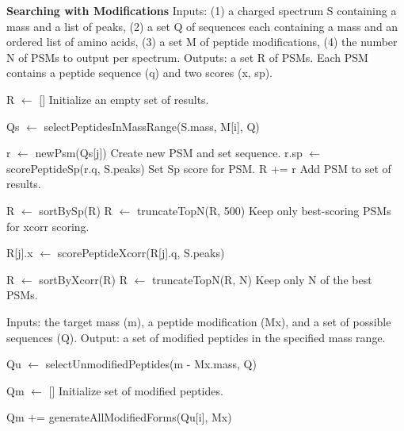 \documentclass[12pt]{article}
\begin{document}
\begin{algorithm}
\caption{{\bf Searching with Modifications} Inputs: (1) a charged
  spectrum S containing a mass and a list of peaks, (2) a set Q of
  sequences each containing a mass and an ordered list of amino acids,
  (3) a set M of peptide modifications, (4) the number N of PSMs to
  output per spectrum. Outputs: a set R of PSMs.  Each PSM contains a
  peptide sequence (q) and two scores (x, sp).}

\begin{algorithmic}[1]

\State R $\gets$ []
\Comment Initialize an empty set of results.

   \State Qs $\gets$ selectPeptidesInMassRange(S.mass, M[i], Q)
   
     \State r $\gets$ newPsm(Qs[j])
     \Comment Create new PSM and set sequence.
     \State r.sp $\gets$ scorePeptideSp(r.q, S.peaks)
     \Comment Set Sp score for PSM.
     \State R += r
     \Comment Add PSM to set of results.
   \EndFor

   \State R $\gets$ sortBySp(R)
   \State R $\gets$ truncateTopN(R, 500)
   \Comment Keep only best-scoring PSMs for xcorr scoring.

     \State R[j].x $\gets$ scorePeptideXcorr(R[j].q, S.peaks)
   \EndFor

   \State R $\gets$ sortByXcorr(R)
   \State R $\gets$ truncateTopN(R, N)
   \Comment Keep only N of the best PSMs.

\EndFor

\State {}
\EndProcedure
\end{algorithmic}
\end{algorithm}

\begin{algorithm}
\caption{ Inputs: the target mass (m), a peptide modification (Mx),
  and a set of possible sequences (Q).  Output: a set of modified
  peptides in the specified mass range.}

\begin{algorithmic}[1]
  \State Qu $\gets$ selectUnmodifiedPeptides(m - Mx.mass, Q)
   
  \State Qm $\gets$ []
  \Comment Initialize set of modified peptides.

      \State Qm += generateAllModifiedForms(Qu[i], Mx)
    \EndIf
  \EndFor

  \State {}
\EndProcedure
\end{algorithmic}
\end{algorithm}
\end{document}
